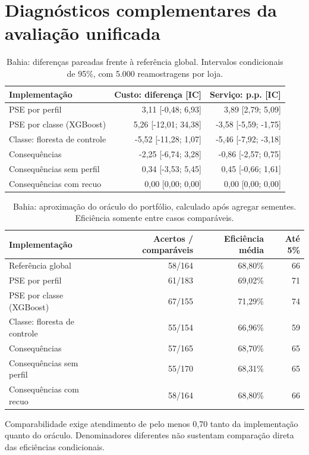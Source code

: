 \section{Diagnósticos complementares da avaliação unificada}
\label{sec:diagnosticos_unificados}
\begin{table}[htbp]\centering\small
\caption{Bahia: diferenças pareadas frente à referência global. Intervalos condicionais de 95\%, com 5.000 reamostragens por loja.}
\label{tab:unificado_delta_ba}
\begin{tabular}{@{}p{4.4cm}rr@{}}\toprule
Implementação & Custo: diferença [IC] & Serviço: p.p. [IC]\\\midrule
PSE por perfil & 3,11 [-0,48; 6,93] & 3,89 [2,79; 5,09]\\
PSE por classe (XGBoost) & 5,26 [-12,01; 34,38] & -3,58 [-5,59; -1,75]\\
Classe: floresta de controle & -5,52 [-11,28; 1,07] & -5,46 [-7,92; -3,18]\\
Consequências & -2,25 [-6,74; 3,28] & -0,86 [-2,57; 0,75]\\
Consequências sem perfil & 0,34 [-3,53; 5,45] & 0,45 [-0,66; 1,61]\\
Consequências com recuo & 0,00 [0,00; 0,00] & 0,00 [0,00; 0,00]\\
\bottomrule\end{tabular}\end{table}
\begin{table}[htbp]\centering\small
\caption{Bahia: aproximação do oráculo do portfólio, calculado após agregar sementes. Eficiência somente entre casos comparáveis.}
\label{tab:unificado_oraculo_ba}
\begin{tabular}{@{}p{4.4cm}rrr@{}}\toprule
Implementação & Acertos / comparáveis & Eficiência média & Até 5\%\\\midrule
Referência global & 58/164 & 68,80\% & 66\\
PSE por perfil & 61/183 & 69,02\% & 71\\
PSE por classe (XGBoost) & 67/155 & 71,29\% & 74\\
Classe: floresta de controle & 55/154 & 66,96\% & 59\\
Consequências & 57/165 & 68,70\% & 65\\
Consequências sem perfil & 55/170 & 68,31\% & 65\\
Consequências com recuo & 58/164 & 68,80\% & 66\\
\bottomrule\end{tabular}
\par\footnotesize Comparabilidade exige atendimento de pelo menos 0,70 tanto da implementação quanto do oráculo. Denominadores diferentes não sustentam comparação direta das eficiências condicionais.
\end{table}
